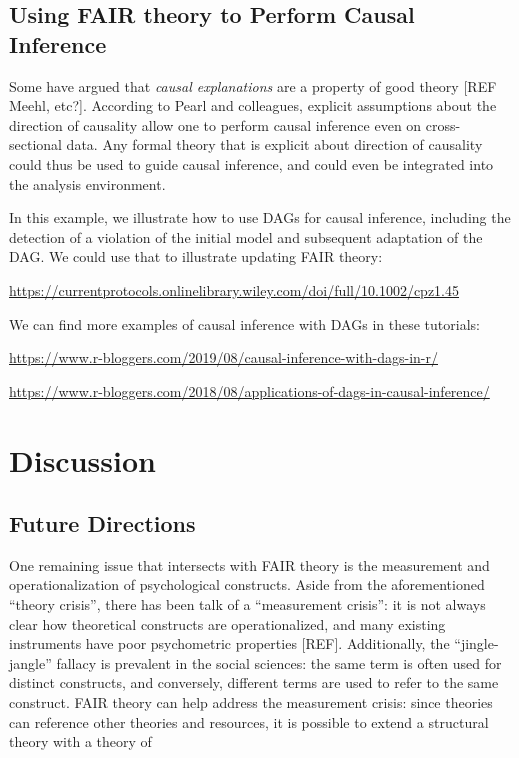 \documentclass[
  man,floatsintext]{apa6}
\begin{document}
\subsection{Using FAIR theory to Perform Causal Inference}\label{using-fair-theory-to-perform-causal-inference}

Some have argued that \emph{causal explanations} are a property of good theory {[}REF Meehl, etc?{]}.
According to Pearl and colleagues,
explicit assumptions about the direction of causality allow one to perform causal inference even on cross-sectional data.
Any formal theory that is explicit about direction of causality could thus be used to guide causal inference,
and could even be integrated into the analysis environment.

In this example, we illustrate how to use DAGs for causal inference, including the detection of a violation of the initial model and subsequent adaptation of the DAG. We could use that to illustrate updating FAIR theory:

\url{https://currentprotocols.onlinelibrary.wiley.com/doi/full/10.1002/cpz1.45}

We can find more examples of causal inference with DAGs in these tutorials:

\url{https://www.r-bloggers.com/2019/08/causal-inference-with-dags-in-r/}

\url{https://www.r-bloggers.com/2018/08/applications-of-dags-in-causal-inference/}

\section{Discussion}\label{discussion}

\subsection{Future Directions}\label{future-directions}

One remaining issue that intersects with FAIR theory is the measurement and operationalization of psychological constructs.
Aside from the aforementioned ``theory crisis'', there has been talk of a ``measurement crisis'':
it is not always clear how theoretical constructs are operationalized, and many existing instruments have poor psychometric properties {[}REF{]}.
Additionally, the ``jingle-jangle'' fallacy is prevalent in the social sciences:
the same term is often used for distinct constructs, and conversely, different terms are used to refer to the same construct.
FAIR theory can help address the measurement crisis:
since theories can reference other theories and resources, it is possible to extend a structural theory with a theory of
\end{document}
